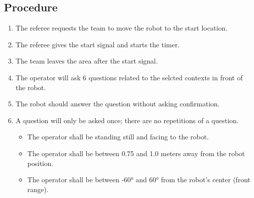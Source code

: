 \subsection*{Procedure}
	\begin{enumerate}[nosep]
		\item The referee requests the team to move the robot to the start location.
		\item The referee gives the start signal and starts the timer.
		\item The team leaves the area after the start signal.		
		
		\item The operator will ask 6 questions related to the selcted contexts in front of the robot.
		\item The robot should answer the question without asking confirmation.
		\item A question will only be asked once; there are no repetitions of a question.
		\begin{itemize}
		    \item The operator shall be standing still and facing to the robot.
		    \item The operator shall be between 0.75 and 1.0 meters away from the robot position.
    		\item The operator shall be between -60° and 60° from the robot's center (front range).
		\end{itemize}
	\end{enumerate}

